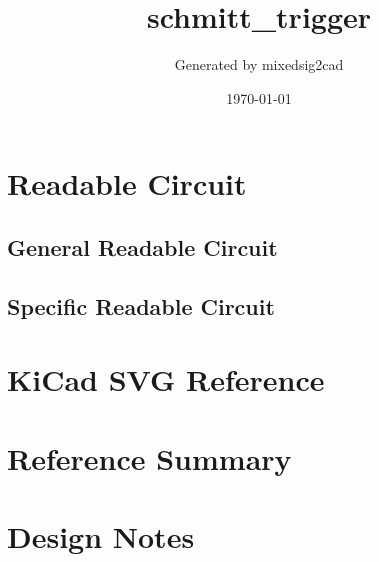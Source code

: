 \documentclass[11pt]{article}
\title{schmitt\_trigger}
\author{Generated by mixedsig2cad}
\date{\today}
\begin{document}
\maketitle
\section{Readable Circuit}
\subsection{General Readable Circuit}

\subsection{Specific Readable Circuit}

\section{KiCad SVG Reference}
\section{Reference Summary}

\section{Design Notes}

\end{document}
